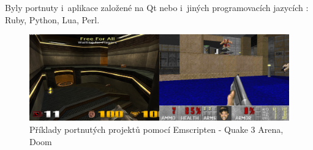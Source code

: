 \documentclass[12pt,a4paper,titlepage,final]{report}
\begin{document}
Byly portnuty i~aplikace založené na Qt nebo i~jiných programovacích jazycích \cite{portex}: Ruby, Python, Lua, Perl.

\begin{figure}[ht]
\begin{center}
\includegraphics[width=14cm]{images/quakedoom.jpg}
\caption{Příklady portnutých projektů pomocí Emscripten - Quake 3 Arena, Doom}
\label{fig:theory}
\end{center}
\end{figure}
	



\nocite{comparison}
\nocite{comparison2d}
\nocite{comparison-book}
\nocite{choose-api}
\nocite{engines}


\hypertarget{bib}{}

\end{document}
